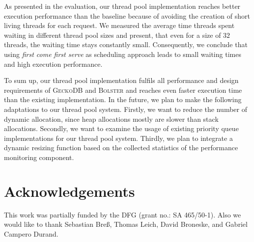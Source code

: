 \documentclass[conference]{IEEEtran}
\begin{document}
As presented in the evaluation, our thread pool implementation reaches better execution performance than the baseline because of avoiding the creation of short living threads for each request. We measured the average time threads spent waiting in different thread pool sizes and present, that even for a size of $32$ threads, the waiting time stays constantly small. Consequently, we conclude that using \emph{first come first serve} as scheduling approach leads to small waiting times and high execution performance. 

To sum up, our thread pool implementation fulfils all performance and design requirements of \textsc{GeckoDB} and \textsc{Bolster} and reaches even faster execution time than the existing implementation. In the future, we plan to make the following adaptations to our thread pool system. Firstly, we want to reduce the number of dynamic allocation, since heap allocations mostly are slower than stack allocations. Secondly, we want to examine the usage of existing priority queue implementations for our thread pool system. Thirdly, we plan to integrate a dynamic resizing function based on the collected statistics of the performance monitoring component. 


\section{Acknowledgements}
This work was partially funded by the DFG (grant no.: SA 465/50-1). Also we would like to thank Sebastian Bre\ss, Thomas Leich, David Broneske, and Gabriel Campero Durand.





\balance

\end{document}
